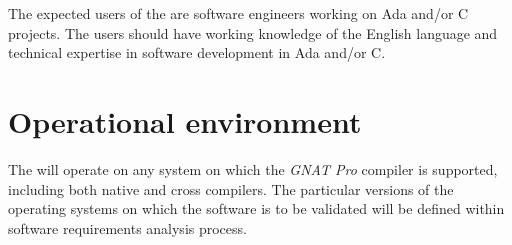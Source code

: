 The expected users of the \ssat{} are software engineers working on Ada
and/or C projects. The users should have working knowledge of the
English language and technical expertise in software development in
Ada and/or C.

\section{Operational environment}

The \ssat{} will operate on any system on which the \emph{GNAT Pro}
compiler is supported, including both native and cross compilers. The
particular versions of the operating systems on which the software is
to be validated will be defined within software requirements analysis
process.
